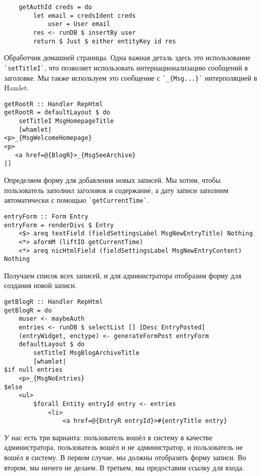 \begin{lstlisting}
    getAuthId creds = do
        let email = credsIdent creds
            user = User email
        res <- runDB $ insertBy user
        return $ Just $ either entityKey id res
\end{lstlisting}
 
Обработчик домашней страницы. Одна важная деталь здесь это использование \lstinline'`setTitleI`', что позволяет использовать интернационализацию сообщений в заголовке. Мы также используем это сообщение с \lstinline'`_{Msg...}`' интерполяцией в Hamlet. 
 
\begin{lstlisting}
getRootR :: Handler RepHtml
getRootR = defaultLayout $ do
    setTitleI MsgHomepageTitle
    [whamlet|
<p>_{MsgWelcomeHomepage}
<p>
   <a href=@{BlogR}>_{MsgSeeArchive}
|]
\end{lstlisting}
 
Определяем форму для добавления новых записей. Мы хотим, чтобы пользователь заполнил заголовок и содержание, а дату записи заполним автоматически с помощью \lstinline'`getCurrentTime`'. 
 
\begin{lstlisting}
entryForm :: Form Entry
entryForm = renderDivs $ Entry
    <$> areq textField (fieldSettingsLabel MsgNewEntryTitle) Nothing
    <*> aformM (liftIO getCurrentTime)
    <*> areq nicHtmlField (fieldSettingsLabel MsgNewEntryContent) Nothing
\end{lstlisting}
 
Получаем список всех записей, и для администратора отобразим форму для создания новой записи. 
 
\begin{lstlisting}
getBlogR :: Handler RepHtml
getBlogR = do
    muser <- maybeAuth
    entries <- runDB $ selectList [] [Desc EntryPosted]
    (entryWidget, enctype) <- generateFormPost entryForm
    defaultLayout $ do
        setTitleI MsgBlogArchiveTitle
        [whamlet|
$if null entries
    <p>_{MsgNoEntries}
$else
    <ul>
        $forall Entity entryId entry <- entries
            <li>
                <a href=@{EntryR entryId}>#{entryTitle entry}
\end{lstlisting}
 
У нас есть три варианта: пользователь вошёл в систему в качестве администратора, пользователь вошёл и не администратор, и пользователь не вошёл в систему. В первом случае, мы должны отобразить форму записи. Во втором, мы ничего не делаем. В третьем, мы предоставим ссылку для входа. 
 
